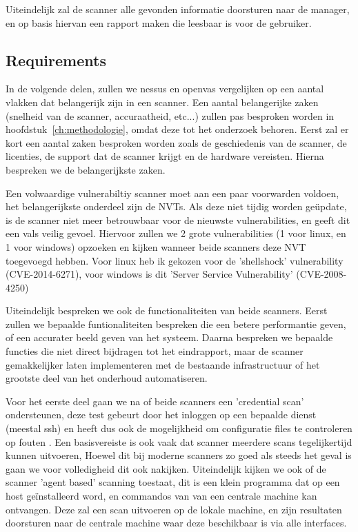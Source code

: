 Uiteindelijk zal de scanner alle gevonden informatie doorsturen naar de manager, en op basis hiervan een rapport maken die leesbaar is voor de gebruiker.

\subsection{Requirements}


In de volgende delen, zullen we nessus en openvas vergelijken op een aantal vlakken dat belangerijk zijn in een scanner. Een aantal belangerijke zaken (snelheid van de scanner, accuraatheid, etc...) zullen pas besproken worden in hoofdstuk~\ref{ch:methodologie}, omdat deze tot het onderzoek behoren. Eerst zal er kort een aantal zaken besproken worden zoals de geschiedenis van de scanner, de licenties, de support dat de scanner krijgt en de hardware vereisten. Hierna bespreken we de belangerijkste zaken.

Een volwaardige vulnerabiltiy scanner moet aan een paar voorwarden voldoen, het belangerijkste onderdeel zijn de NVTs. Als deze niet tijdig worden geüpdate, is de scanner niet meer betrouwbaar voor de nieuwste vulnerabilities, en geeft dit een vals veilig gevoel. Hiervoor zullen we 2 grote vulnerabilities (1 voor linux, en 1 voor windows) opzoeken en kijken wanneer beide scanners deze NVT toegevoegd hebben. Voor linux heb ik gekozen voor de 'shellshock' vulnerability (CVE-2014-6271), voor windows is dit 'Server Service Vulnerability' (CVE-2008-4250)

Uiteindelijk bespreken we ook de functionaliteiten van beide scanners. Eerst zullen we bepaalde funtionaliteiten bespreken die een betere performantie geven, of een accurater beeld geven van het systeem. Daarna bespreken we bepaalde functies die niet direct bijdragen tot het eindrapport, maar de scanner gemakkelijker laten implementeren met de bestaande infrastructuur of het grootste deel van het onderhoud automatiseren. 

Voor het eerste deel gaan we na of beide scanners een 'credential scan' ondersteunen, deze test gebeurt door het inloggen op een bepaalde dienst (meestal ssh) en heeft dus ook de mogelijkheid om configuratie files te controleren op fouten \textcite{Digitalbond}. Een basisvereiste is ook vaak dat scanner meerdere scans tegelijkertijd kunnen uitvoeren, Hoewel dit bij moderne scanners zo goed als steeds het geval is gaan we voor volledigheid dit ook nakijken. Uiteindelijk kijken we ook of de scanner 'agent based' scanning toestaat, dit is een klein programma dat op een host geïnstalleerd word, en commandos van van een centrale machine kan ontvangen. Deze zal een scan uitvoeren op de lokale machine, en zijn resultaten doorsturen naar de centrale machine waar deze beschikbaar is via alle interfaces.

